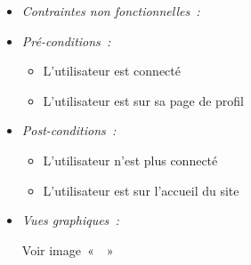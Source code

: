 \begin{itemize}
\item \textit{Contraintes non fonctionnelles~:}

\item \textit{Pré-conditions~:}

    \begin{itemize}
        \item L'utilisateur est connecté
        \item L'utilisateur est sur sa page de profil
    \end{itemize}

\item \textit{Post-conditions~:}

    \begin{itemize}
        \item L'utilisateur n'est plus connecté 
        \item L'utilisateur est sur l'accueil du site
    \end{itemize}

\item \textit{Vues graphiques~:}

Voir image~«~~»

\end{itemize}